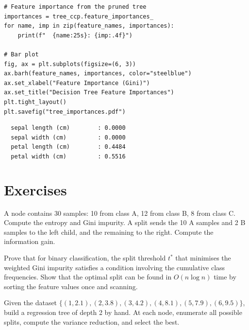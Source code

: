 \begin{codeblock}[title=\textbf{Feature Importance}]
\begin{verbatim}
# Feature importance from the pruned tree
importances = tree_ccp.feature_importances_
for name, imp in zip(feature_names, importances):
    print(f"  {name:25s}: {imp:.4f}")

# Bar plot
fig, ax = plt.subplots(figsize=(6, 3))
ax.barh(feature_names, importances, color="steelblue")
ax.set_xlabel("Feature Importance (Gini)")
ax.set_title("Decision Tree Feature Importances")
plt.tight_layout()
plt.savefig("tree_importances.pdf")
\end{verbatim}
\end{codeblock}

\begin{codeoutput}
\begin{verbatim}
  sepal length (cm)        : 0.0000
  sepal width (cm)         : 0.0000
  petal length (cm)        : 0.4484
  petal width (cm)         : 0.5516
\end{verbatim}
\end{codeoutput}

\section{Exercises}

\begin{exercise}
A node contains 30 samples: 10 from class A, 12 from class B, 8 from class C. Compute the entropy and Gini impurity. A split sends the 10 A samples and 2 B samples to the left child, and the remaining to the right. Compute the information gain.
\end{exercise}

\begin{exercise}
Prove that for binary classification, the split threshold $t^*$ that minimises the weighted Gini impurity satisfies a condition involving the cumulative class frequencies. Show that the optimal split can be found in $O(n\log n)$ time by sorting the feature values once and scanning.
\end{exercise}

\begin{exercise}
Given the dataset $\{(1, 2.1), (2, 3.8), (3, 4.2), (4, 8.1), (5, 7.9), (6, 9.5)\}$, build a regression tree of depth 2 by hand. At each node, enumerate all possible splits, compute the variance reduction, and select the best.
\end{exercise}

